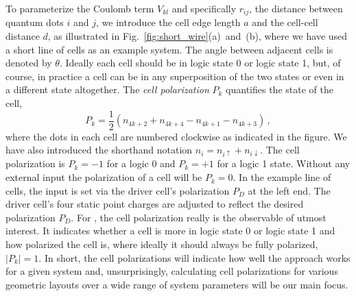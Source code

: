 To parameterize the Coulomb term $V_{kl}$ and specifically $r_{ij}$, the
distance between quantum dots $i$ and $j$, we introduce the cell edge length $a$
and the cell-cell distance $d$, as illustrated in
Fig.~\ref{fig:short_wire}(a)~and~(b), where we have used a short line of cells
as an example  system. The angle between adjacent cells is denoted by
$\theta$. Ideally each cell should be in logic state 0 or logic state 1, but, of
course, in practice a cell can be in any superposition of the two states or even
in a different state altogether. The \emph{cell polarization} $P_k$ quantifies
the state of the cell, \begin{equation} \label{eq:polarization} P_k =
  \frac{1}{2} \left( n_{4k+2} + n_{4k+4} - n_{4k+1} - n_{4k+3} \right) \, ,
\end{equation} where the dots in each cell are numbered clockwise as indicated
in the figure. We have also introduced the shorthand notation $n_i =
n_{i\uparrow} + n_{i\downarrow}$. The cell polarization is $P_k = -1$ for a
logic 0 and $P_k = +1$ for a logic 1 state. Without any external input the
polarization of a cell will be $P_k = 0$. In the example line of cells, the
input is set via the driver cell's polarization $P_D$ at the left end. The
driver cell's four static point charges are adjusted to reflect the desired
polarization $P_D$. For , the cell polarization really is the
observable of utmost interest. It indicates whether a cell is more in logic
state 0 or logic state 1 and how polarized the cell is, where ideally it should
always be fully polarized, $|P_k| = 1$. In short, the cell polarizations will
indicate how well the  approach works for a given system and,
unsurprisingly, calculating cell polarizations for various geometric layouts
over a wide range of system parameters will be our main focus.

